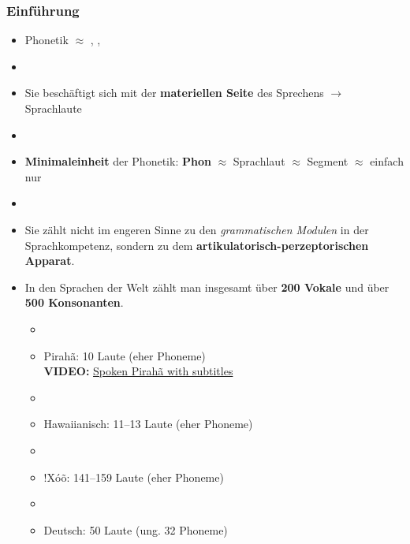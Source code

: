 \begin{frame}
\frametitle{Einführung}

	\begin{itemize}
		\item Phonetik $\approx$ , , 
		\item[]
		\item Sie beschäftigt sich mit der \textbf{materiellen Seite} des Sprechens $\rightarrow$ Sprachlaute 
		\item[]
		\item \textbf{Minimaleinheit} der Phonetik: \textbf{Phon} $\approx$ Sprachlaut $\approx$ Segment $\approx$ einfach nur 
		\item[]
		\item Sie zählt nicht im engeren Sinne zu den \textit{grammatischen Modulen} in der Sprachkompetenz, sondern zu dem \textbf{artikulatorisch-perzeptorischen Apparat}.
	\end{itemize}
	
\end{frame}




\begin{frame}

	\begin{itemize}
		\item In den Sprachen der Welt zählt man insgesamt über \textbf{200 Vokale} und über \textbf{500 Konsonanten}.
		
		\begin{itemize}
			\item[]
			\item Pirahã: 10 Laute (eher Phoneme)\\
			\textbf{VIDEO:} \href{run:material/04SpokenPiraha.mp4}{Spoken Pirahã with subtitles}
			\item[]
			\item Hawaiianisch: 11--13 Laute (eher Phoneme)
			\item[]
			\item {!}Xóõ: 141--159 Laute (eher Phoneme)
			\item[]
			\item Deutsch: 50 Laute (ung. 32 Phoneme)
		\end{itemize}
		
	\end{itemize}
	
\end{frame}



